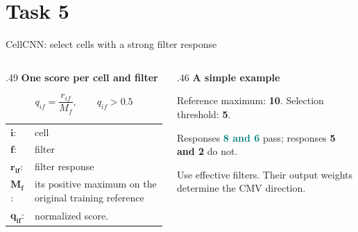 \documentclass[aspectratio=169,10pt]{beamer}
\newcommand{\eyebrow}[1]{{\color{Teal}\bfseries #1}\par\smallskip}
\newcommand{\compactmath}{%
  \setlength{\abovedisplayskip}{4pt}\setlength{\belowdisplayskip}{4pt}%
  \setlength{\abovedisplayshortskip}{2pt}\setlength{\belowdisplayshortskip}{4pt}}
\begin{document}
\section{Task 5}
\begin{frame}[t]{CellCNN: select cells with a strong filter response}
  \relax
  {\centering
  \par}
  \begin{columns}[T,onlytextwidth]
    \begin{column}{.49\textwidth}
      \eyebrow{One score per cell and filter}
      \compactmath
      \[q_{if}=\frac{r_{if}}{M_f},\qquad q_{if}>0.5\]
      {\small\begin{tabular}{@{}l@{\quad}>{\raggedright\arraybackslash}p{.78\linewidth}@{}}
        $\boldsymbol{i}$: & cell\\
        $\boldsymbol{f}$: & filter\\
        $\boldsymbol{r_{if}}$: & filter response\\
        $\boldsymbol{M_f}$: & its positive maximum on the original training reference\\
        $\boldsymbol{q_{if}}$: & normalized score.
      \end{tabular}}
    \end{column}
    \begin{column}{.46\textwidth}
      \eyebrow{A simple example}
      Reference maximum: \textbf{10}. Selection threshold: \textbf{5}.\par\medskip
      Responses \textcolor{Teal}{\textbf{8 and 6}} pass; responses \textcolor{Muted}{\textbf{5 and 2}} do not.\par\medskip
      \small Use effective filters. Their output weights determine the CMV direction.
    \end{column}
  \end{columns}
\end{frame}
\end{document}
